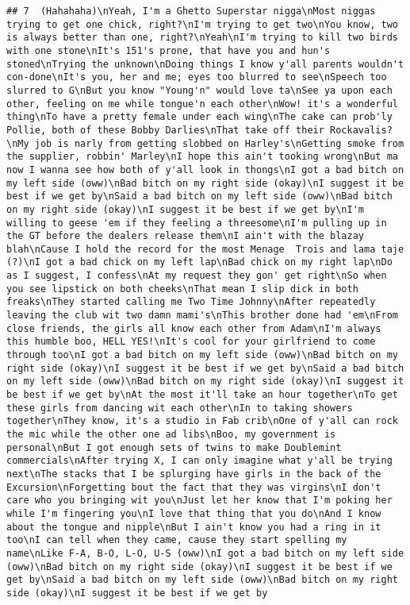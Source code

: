 \documentclass[]{article}
\begin{document}
\begin{verbatim}
## 7  (Hahahaha)\nYeah, I'm a Ghetto Superstar nigga\nMost niggas trying to get one chick, right?\nI'm trying to get two\nYou know, two is always better than one, right?\nYeah\nI'm trying to kill two birds with one stone\nIt's 151's prone, that have you and hun's stoned\nTrying the unknown\nDoing things I know y'all parents wouldn't con-done\nIt's you, her and me; eyes too blurred to see\nSpeech too slurred to G\nBut you know "Young'n" would love ta\nSee ya upon each other, feeling on me while tongue'n each other\nWow! it's a wonderful thing\nTo have a pretty female under each wing\nThe cake can prob'ly Pollie, both of these Bobby Darlies\nThat take off their Rockavalis?\nMy job is narly from getting slobbed on Harley's\nGetting smoke from the supplier, robbin' Marley\nI hope this ain't tooking wrong\nBut ma now I wanna see how both of y'all look in thongs\nI got a bad bitch on my left side (oww)\nBad bitch on my right side (okay)\nI suggest it be best if we get by\nSaid a bad bitch on my left side (oww)\nBad bitch on my right side (okay)\nI suggest it be best if we get by\nI'm willing to geese 'em if they feeling a threesome\nI'm pulling up in the GT before the dealers release them\nI ain't with the blazay blah\nCause I hold the record for the most Menage  Trois and lama taje (?)\nI got a bad chick on my left lap\nBad chick on my right lap\nDo as I suggest, I confess\nAt my request they gon' get right\nSo when you see lipstick on both cheeks\nThat mean I slip dick in both freaks\nThey started calling me Two Time Johnny\nAfter repeatedly leaving the club wit two damn mami's\nThis brother done had 'em\nFrom close friends, the girls all know each other from Adam\nI'm always this humble boo, HELL YES!\nIt's cool for your girlfriend to come through too\nI got a bad bitch on my left side (oww)\nBad bitch on my right side (okay)\nI suggest it be best if we get by\nSaid a bad bitch on my left side (oww)\nBad bitch on my right side (okay)\nI suggest it be best if we get by\nAt the most it'll take an hour together\nTo get these girls from dancing wit each other\nIn to taking showers together\nThey know, it's a studio in Fab crib\nOne of y'all can rock the mic while the other one ad libs\nBoo, my government is personal\nBut I got enough sets of twins to make Doublemint commercials\nAfter trying X, I can only imagine what y'all be trying next\nThe stacks that I be splurging have girls in the back of the Excursion\nForgetting bout the fact that they was virgins\nI don't care who you bringing wit you\nJust let her know that I'm poking her while I'm fingering you\nI love that thing that you do\nAnd I know about the tongue and nipple\nBut I ain't know you had a ring in it too\nI can tell when they came, cause they start spelling my name\nLike F-A, B-O, L-O, U-S (oww)\nI got a bad bitch on my left side (oww)\nBad bitch on my right side (okay)\nI suggest it be best if we get by\nSaid a bad bitch on my left side (oww)\nBad bitch on my right side (okay)\nI suggest it be best if we get by

\end{verbatim}
\end{document}
